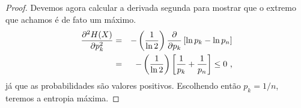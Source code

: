 \begin{frame}[allowframebreaks]
\begin{proof}
    \proofbreak
    Devemos agora calcular a derivada segunda para mostrar que o extremo que achamos é de fato um máximo.
    \begin{eqnarray}\label{ea:d2Heqz}
        \frac{\partial^2 H(X)}{ \partial p_k^2 } &=& - \left( \frac{1}{\ln 2} \right) \frac{\partial}{ \partial p_k } \left[ \ln p_k - \ln p_n \right] \nonumber \\
           &=& - \left( \frac{1}{\ln 2} \right) \left[ \frac{1}{p_k} + \frac{1}{p_n} \right] \leq 0 \textmd{ ,}
    \end{eqnarray}
    já que as probabilidades são valores positivos. Escolhendo então $p_k = 1/n$, teremos a entropia máxima.

  \end{proof}
\end{frame}



